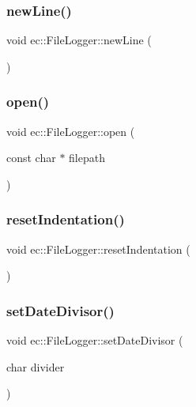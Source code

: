 \subsubsection{\texorpdfstring{new\+Line()}{newLine()}}
{\footnotesize\ttfamily void ec\+::\+File\+Logger\+::new\+Line (\begin{DoxyParamCaption}{ }\end{DoxyParamCaption})}

\mbox{\label{classec_1_1_file_logger_a5229bec7b392fb723188f80b8c4a776c}} 
\subsubsection{\texorpdfstring{open()}{open()}}
{\footnotesize\ttfamily void ec\+::\+File\+Logger\+::open (\begin{DoxyParamCaption}\item[{const char $\ast$}]{filepath }\end{DoxyParamCaption})}

\mbox{\label{classec_1_1_file_logger_af440c1355b7bd328e2ffe80693e3a0dd}} 
\subsubsection{\texorpdfstring{reset\+Indentation()}{resetIndentation()}}
{\footnotesize\ttfamily void ec\+::\+File\+Logger\+::reset\+Indentation (\begin{DoxyParamCaption}{ }\end{DoxyParamCaption})}

\mbox{\label{classec_1_1_file_logger_a8e8d1d7c8f274ee930f4ae9bf509343b}} 
\subsubsection{\texorpdfstring{set\+Date\+Divisor()}{setDateDivisor()}}
{\footnotesize\ttfamily void ec\+::\+File\+Logger\+::set\+Date\+Divisor (\begin{DoxyParamCaption}\item[{char}]{divider }\end{DoxyParamCaption})\hspace{0.3cm}{\ttfamily [static]}}

